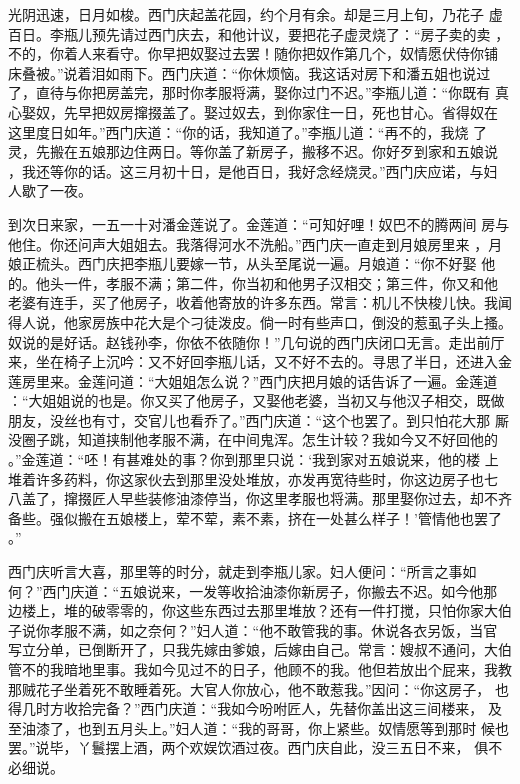 光阴迅速，日月如梭。西门庆起盖花园，约个月有余。却是三月上旬，乃花子
虚百日。李瓶儿预先请过西门庆去，和他计议，要把花子虚灵烧了：“房子卖的卖
，不的，你着人来看守。你早把奴娶过去罢！随你把奴作第几个，奴情愿伏侍你铺
床叠被。”说着泪如雨下。西门庆道：“你休烦恼。我这话对房下和潘五姐也说过
了，直待与你把房盖完，那时你孝服将满，娶你过门不迟。”李瓶儿道：“你既有
真心娶奴，先早把奴房撺掇盖了。娶过奴去，到你家住一日，死也甘心。省得奴在
这里度日如年。”西门庆道：“你的话，我知道了。”李瓶儿道：“再不的，我烧
了灵，先搬在五娘那边住两日。等你盖了新房子，搬移不迟。你好歹到家和五娘说
，我还等你的话。这三月初十日，是他百日，我好念经烧灵。”西门庆应诺，与妇
人歇了一夜。

到次日来家，一五一十对潘金莲说了。金莲道：“可知好哩！奴巴不的腾两间
房与他住。你还问声大姐姐去。我落得河水不洗船。”西门庆一直走到月娘房里来
，月娘正梳头。西门庆把李瓶儿要嫁一节，从头至尾说一遍。月娘道：“你不好娶
他的。他头一件，孝服不满；第二件，你当初和他男子汉相交；第三件，你又和他
老婆有连手，买了他房子，收着他寄放的许多东西。常言：机儿不快梭儿快。我闻
得人说，他家房族中花大是个刁徒泼皮。倘一时有些声口，倒没的惹虱子头上搔。
奴说的是好话。赵钱孙李，你依不依随你！”几句说的西门庆闭口无言。走出前厅
来，坐在椅子上沉吟：又不好回李瓶儿话，又不好不去的。寻思了半日，还进入金
莲房里来。金莲问道：“大姐姐怎么说？”西门庆把月娘的话告诉了一遍。金莲道
：“大姐姐说的也是。你又买了他房子，又娶他老婆，当初又与他汉子相交，既做
朋友，没丝也有寸，交官儿也看乔了。”西门庆道：“这个也罢了。到只怕花大那
厮没圈子跳，知道挟制他孝服不满，在中间鬼浑。怎生计较？我如今又不好回他的
。”金莲道：“呸！有甚难处的事？你到那里只说：‘我到家对五娘说来，他的楼
上堆着许多药料，你这家伙去到那里没处堆放，亦发再宽待些时，你这边房子也七
八盖了，撺掇匠人早些装修油漆停当，你这里孝服也将满。那里娶你过去，却不齐
备些。强似搬在五娘楼上，荤不荤，素不素，挤在一处甚么样子！’管情他也罢了
。”

西门庆听言大喜，那里等的时分，就走到李瓶儿家。妇人便问：“所言之事如
何？”西门庆道：“五娘说来，一发等收拾油漆你新房子，你搬去不迟。如今他那
边楼上，堆的破零零的，你这些东西过去那里堆放？还有一件打搅，只怕你家大伯
子说你孝服不满，如之奈何？”妇人道：“他不敢管我的事。休说各衣另饭，当官
写立分单，已倒断开了，只我先嫁由爹娘，后嫁由自己。常言：嫂叔不通问，大伯
管不的我暗地里事。我如今见过不的日子，他顾不的我。他但若放出个屁来，我教
那贼花子坐着死不敢睡着死。大官人你放心，他不敢惹我。”因问：“你这房子，
也得几时方收拾完备？”西门庆道：“我如今吩咐匠人，先替你盖出这三间楼来，
及至油漆了，也到五月头上。”妇人道：“我的哥哥，你上紧些。奴情愿等到那时
候也罢。”说毕，丫鬟摆上酒，两个欢娱饮酒过夜。西门庆自此，没三五日不来，
俱不必细说。

